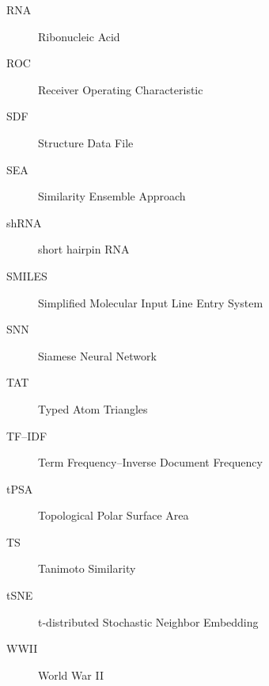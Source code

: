 \begin{description}
    \item[RNA] Ribonucleic Acid
    \item[ROC] Receiver Operating Characteristic
    \item[SDF] Structure Data File
    \item[SEA] Similarity Ensemble Approach
    \item[shRNA] short hairpin RNA
    \item[SMILES] Simplified Molecular Input Line Entry System
    \item[SNN] Siamese Neural Network
    \item[TAT] Typed Atom Triangles
    \item[TF–IDF] Term Frequency–Inverse Document Frequency
    \item[tPSA] Topological Polar Surface Area
    \item[TS] Tanimoto Similarity
    \item[tSNE] t-distributed Stochastic Neighbor Embedding
    \item[WWII] World War II
\end{description}

